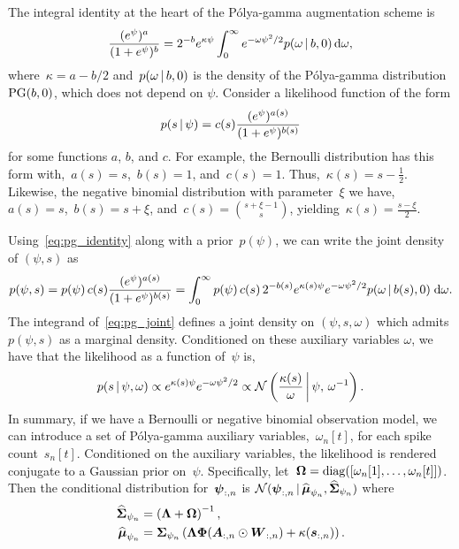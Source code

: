 The integral identity at the heart of the P\'{o}lya-gamma augmentation scheme \cite{polson2013bayesian} is
\begin{equation}
\label{eq:pg_identity}
\frac{(e^{\psi})^a}{(1+e^{\psi})^b} = 2^{-b} e^{\kappa \psi} \int_{0}^{\infty} e^{-\omega \psi^2 /2} p(\omega \,|\, b, 0) \, \mathrm{d}\omega,
\end{equation}
where~${\kappa=a-b/2}$ and~$p(\omega\,|\, b, 0)$ is the density of the P\'{o}lya-gamma
distribution~${\mathrm{PG}(b, 0)}$, which does not depend on $\psi$.
Consider a likelihood function of the form
\begin{equation}
  \label{eq:logit_likelihood}
  p(s \,|\, \psi) = c(s) \frac{(e^\psi)^{a(s)}}{(1+e^\psi)^{b(s)}}
\end{equation}
for some functions $a$, $b$, and $c$.
For example, the Bernoulli distribution has this form with,~$a(s)=s$,~$b(s)=1$, and~$c(s)=1$. Thus,~$\kappa(s)=s-\frac{1}{2}$. Likewise, the negative binomial distribution with parameter~$\xi$ we have,~$a(s)=s$,~$b(s)=s+\xi$, and~$c(s)={s + \xi -1 \choose s}$, yielding~$\kappa(s)=\frac{s-\xi}{2}$.

Using~\eqref{eq:pg_identity} along with a prior~$p(\psi)$, we can write the joint density of $(\psi, s)$ as
\begin{equation}
  \label{eq:pg_joint}
  p(\psi, s) = p(\psi) \, c(s) \frac{(e^\psi)^{a(s)}}{(1+e^\psi)^{b(s)}} = \int_0^\infty
  p(\psi) \, c(s) \, 2^{-b(s)} e^{\kappa(s) \psi} e^{-\omega \psi^2/2} p(\omega \,|\, b(s), 0) \; \mathrm{d}\omega.
\end{equation}
The integrand of~\eqref{eq:pg_joint} defines a joint density on $(\psi, s,
\omega)$ which admits $p(\psi, s)$ as a marginal density.
Conditioned on these auxiliary variables $\omega$, we have that the likelihood as a function of~$\psi$ is,
\begin{equation}
  p(s \,|\, \psi, \omega) \propto e^{\kappa(s) \psi} e^{- \omega \psi^2/2} 
\propto \mathcal{N} \left(\frac{\kappa(s)}{\omega} \, \bigg| \, \psi, \, \omega^{-1} \right).
\end{equation}
In summary, if we have a Bernoulli or negative binomial observation model, we can introduce a set of P\'{o}lya-gamma auxiliary variables,~$\omega_n[t]$, for each spike count~$s_n[t]$. Conditioned on the auxiliary variables, the likelihood is rendered conjugate to a Gaussian prior on~$\psi$. Specifically, let~$\boldsymbol{\Omega} = \mathrm{diag}([\omega_{n}[1], \ldots, \omega_n[t]])$. Then the conditional distribution for~$\boldsymbol{\psi}_{:,n}$ is 
$\mathcal{N}(\boldsymbol{\psi}_{:,n} \,|\, \widehat{\boldsymbol{\mu}}_{\psi_n}, \widehat{\boldsymbol{\Sigma}}_{\psi_n})$
where
\begin{align}
\widehat{\boldsymbol{\Sigma}}_{\psi_n} &= \left( \boldsymbol{\Lambda} + \boldsymbol{\Omega} \right)^{-1},
\\
\widehat{\boldsymbol{\mu}}_{\psi_n} &= \boldsymbol{\Sigma}_{\psi_{n}} \left(\boldsymbol{\Lambda} \boldsymbol{\Phi} (\boldsymbol{A}_{:,n} \odot \boldsymbol{W}_{:,n}) + \kappa(\boldsymbol{s}_{:,n}) \right).
\end{align}


